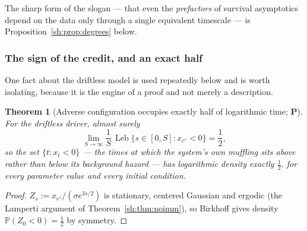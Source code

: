 \documentclass[11pt]{article}
\numberwithin{equation}{section}
\theoremstyle{plain}
\newtheorem{theorem}{Theorem}[section]
\theoremstyle{definition}
\theoremstyle{remark}
\newcommand{\PP}{\mathbb{P}}
\DeclareMathOperator{\Leb}{Leb}
\begin{document}
The sharp form of the slogan --- that even the \emph{prefactors} of survival
asymptotics depend on the data only through a single equivalent timescale ---
is Proposition~\ref{sh:prop:degrees} below.

\subsubsection{The sign of the credit, and an exact half}
\label{gr1:subsub:sign}

One fact about the driftless model is used repeatedly below and is worth
isolating, because it is the engine of a proof and not merely a
description.

\begin{theorem}[Adverse configuration occupies exactly half of
logarithmic time; \textbf{P}]\label{tc:thm:half}
For the driftless driver, almost surely
\begin{equation}\label{tc:eq:half}
\lim_{S\to\infty}\frac1S\,\Leb\bigl\{s\in[0,S]:x_{e^{s}}<0\bigr\}
=\frac12 ,
\end{equation}
so the set $\{t:x_t<0\}$ --- the times at which the system's own
muffling sits \emph{above} rather than below its background hazard ---
has logarithmic density exactly $\tfrac12$, for every parameter value
and every initial condition.
\end{theorem}

\begin{proof}
$Z_s:=x_{e^{s}}/(\sigma e^{3s/2})$ is stationary, centered Gaussian and
ergodic (the Lamperti argument of Theorem~\ref{sh:thm:noimm}), so
Birkhoff gives density $\PP(Z_0<0)=\tfrac12$ by symmetry.
\end{proof}
\end{document}
